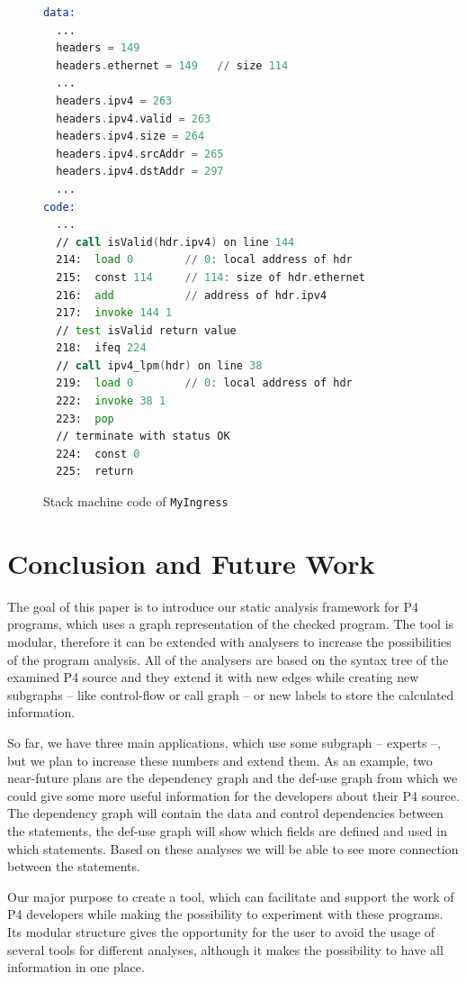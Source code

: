 \documentclass[sigconf]{acmart}
\begin{document}
  \begin{figure}
  \begin{lstlisting}[language=asm]
data:
  ...
  headers = 149 
  headers.ethernet = 149   // size 114
  ...
  headers.ipv4 = 263 
  headers.ipv4.valid = 263 
  headers.ipv4.size = 264 
  headers.ipv4.srcAddr = 265 
  headers.ipv4.dstAddr = 297
  ...
code:
  ...
  // call isValid(hdr.ipv4) on line 144
  214:  load 0	      // 0: local address of hdr
  215:  const 114     // 114: size of hdr.ethernet
  216:  add           // address of hdr.ipv4
  217:  invoke 144 1		 
  // test isValid return value
  218:  ifeq 224		 
  // call ipv4_lpm(hdr) on line 38
  219:  load 0        // 0: local address of hdr
  222:  invoke 38 1		 
  223:  pop
  // terminate with status OK
  224:  const 0		 
  225:  return 
\end{lstlisting}
\caption{Stack machine code of \texttt{MyIngress}}
  \label{code:stack}
\end{figure}
  
	\section{Conclusion and Future Work}
	
	The goal of this paper is to introduce our static analysis framework for P4 programs, which uses a graph representation of the checked program. The tool is modular, therefore it can be extended with analysers to increase the possibilities of the program analysis. All of the analysers are based on the syntax tree of the examined P4 source and they extend it with new edges while creating new subgraphs -- like control-flow or call graph -- or new labels to store the calculated information.
	 
	So far, we have three main applications, which use some subgraph -- experts --, but we plan to increase these numbers and extend them. As an example, two near-future plans are the dependency graph and the def-use graph from which we could give some more useful information for the developers about their P4 source. The dependency graph will contain the data and control dependencies between the statements, the def-use graph will show which fields are defined and used in which statements. Based on these analyses we will be able to see more connection between the statements.		
	
	Our major purpose to create a tool, which can facilitate and support the work of  P4 developers while making the possibility to experiment with these programs. Its modular structure gives the opportunity for the user to avoid the usage of several tools for different analyses, although it makes the possibility to have all information in one place. 
\end{document}
